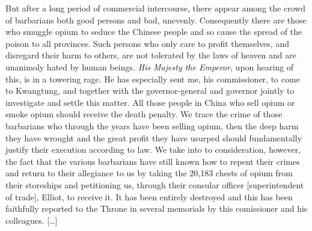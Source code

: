 \begin{fancyquote}
	[\ldots] But after a long period of commercial intercourse, there appear among the crowd of barbarians both good persons and bad, unevenly. Consequently there are those who smuggle opium to seduce the Chinese people and so cause the spread of the poison to all provinces. Such persons who only care to profit themselves, and disregard their harm to others, are not tolerated by the laws of heaven and are unanimoly hated by human beings. \textit{His Majesty the Emperor}, upon hearing of this, is in a towering rage. He has especially sent me, his commissioner, to come to Kwangtung, and together with the governor-general and governor jointly to investigate and settle this matter.
	All those people in China who sell opium or smoke opium should receive the death penalty. We trace the crime of those barbarians who through the years have been selling opium, then the deep harm they have wrought and the great profit they have usurped should fundamentally justify their execution according to law. We take into to consideration, however, the fact that the various barbarians have still known how to repent their crimes and return to their allegiance to us by taking the 20,183 chests of opium from their storeships and petitioning us, through their consular officer [superintendent of trade], Elliot, to receive it. It has been entirely destroyed and this has been faithfully reported to the Throne in several memorials by this comissioner and his colleagues. [\ldots]
	\begin{flushright}
		\autocite{Teng:1979}
	\end{flushright}
\end{fancyquote}
